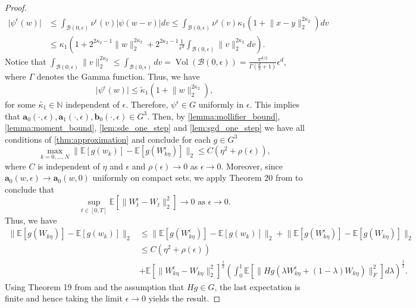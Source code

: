 \documentclass[12pt]{article}
\theoremstyle{definition}
\numberwithin{equation}{section}
\newcommand{\N}{\mathbb{N}}
\newcommand{\CB}{\mathcal{B}}
\newcommand{\moll}{\nu^{\epsilon}}
\newcommand{\ev}[1]{\mathbb{E}\left[{#1}\right]}
\newcommand{\norm}[1]{\lVert{#1}\rVert_2}
\newcommand{\normf}[1]{\lVert{#1}\rVert_F}
\DeclareMathOperator{\vol}{Vol}
\begin{document}
\begin{proof}
\begin{align*}
    \lvert \psi^{\epsilon}(w) \rvert &\leq \int_{\CB(0, \epsilon)} \moll(v) \lvert \psi(w-v) \rvert dv \leq \int_{\CB(0, \epsilon)} \moll(v) \kappa_1 (1 + \norm{x-y}^{2\kappa_2})dv\\
    &\leq \kappa_1\left(1 + 2^{2\kappa_2 - 1} \norm{w}^{2\kappa_2} + 2^{2\kappa_2 - 1}\frac{1}{\epsilon^d}\int_{\CB(0,\epsilon)}\norm{v}^{2\kappa_2}dv\right).
  \end{align*}
  Notice that $\int_{\CB(0,\epsilon)}\norm{v}^{2\kappa_2} \leq \int_{\CB(0,\epsilon)}dv = \vol(\CB(0,\epsilon)) = \frac{\pi^{d/2}}{\Gamma(\frac{d}{2}+1)}\epsilon^d$, where $\Gamma$ denotes the Gamma function. Thus, we have
  \begin{equation*}
    \lvert \psi^{\epsilon}(w) \rvert \leq \widetilde{\kappa}_1(1+ \norm{w}^{2\kappa_2}),
  \end{equation*}
  for some $\widetilde{\kappa_1} \in \N$ independent of $\epsilon$.
  Therefore, $\psi^{\epsilon} \in G$ uniformly in $\epsilon$.
  This implies that $\mathbf{a}_0(\cdot,\epsilon), \mathbf{a}_1(\cdot,\epsilon),\mathbf{b}_0(\cdot, \epsilon) \in G^3$.
  Then, by \autoref{lemma:mollifier_bound}, \autoref{lemma:moment_bound}, \autoref{lem:sde_one_step} and \autoref{lem:sgd_one_step} we have all conditions of \autoref{thm:approximation} and conclude for each $g \in G^3$
  \begin{equation*}
    \max_{k=0,\dots,N}\norm{\ev{g(w_k)} - \ev{g(W^{\epsilon}_{k\eta})}} \leq C(\eta^2 + \rho(\epsilon)),
  \end{equation*}
  where $C$ is independent of $\eta$ and $\epsilon$ and $\rho(\epsilon) \rightarrow 0$ as $\epsilon \rightarrow 0$. Moreover, since $\mathbf{a}_0(w, \epsilon) \rightarrow \mathbf{a}_0(w, 0)$ uniformly on compact sets, we apply Theorem 20 from \cite{liStochasticModifiedEquations2019} to conclude that
  \begin{equation*}
    \sup_{t \in [0,T]}\ev{\norm{W^{\epsilon}_t - W_t}^2} \rightarrow 0 \text{ as } \epsilon \rightarrow 0.
  \end{equation*}
  Thus, we have
  \begin{align*}
    \norm{\ev{g(W_{k\eta})} - \ev{g(w_k)}} &\leq  \norm{\ev{g(W_{k\eta}^\epsilon)} - \ev{g(w_k)}} + \norm{\ev{g(W_{k\eta}^{\epsilon})} - \ev{g(W_{k\eta})}} \\
    &\leq C(\eta^2 + \rho(\epsilon)) \\
    &+ \ev{\norm{W^{\epsilon}_{k\eta} - W_{k\eta}}^2}^{\frac{1}{2}} \left( \int_0^1 \ev{\normf{Hg(\lambda W^{\epsilon}_{k\eta} + (1-\lambda)W_{k\eta})}^2}d\lambda\right)^{\frac{1}{2}}.
  \end{align*}
  Using Theorem 19 from \cite{liStochasticModifiedEquations2019} and the assumption that $Hg \in G$, the last expectation is finite and hence taking the limit $\epsilon \rightarrow 0$ yields the result.
\end{proof}
\end{document}
